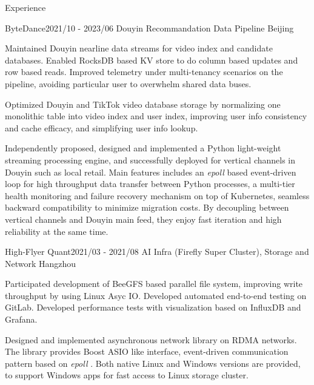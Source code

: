 \documentclass[
	a4paper,  %
	11pt,  %
]{resume}  %
\begin{document}
\begin{rSection}{Experience}

	\begin{rSubsection}{ByteDance}{2021/10 - 2023/06}{ Douyin Recommandation Data Pipeline }{Beijing}
		\item Maintained Douyin nearline data streams for video index and candidate databases.
			  Enabled RocksDB based KV store to do column based updates and row based reads.
			  Improved telemetry under multi-tenancy scenarios on the pipeline,
			  avoiding particular user to overwhelm shared data buses. 
		\item Optimized Douyin and TikTok video database storage by normalizing one monolithic table
			  into video index and user index, improving user info consistency and cache efficacy,
			  and simplifying user info lookup.
		\item Independently proposed, designed and implemented a Python light-weight streaming processing engine,
			  and successfully deployed for vertical channels in Douyin such as local retail.
			  Main features includes an \textit{ epoll } based event-driven loop for high throughput data transfer between Python processes,
			  a multi-tier health monitoring and failure recovery mechanism on top of Kubernetes,
			  seamless backward compatibility to minimize migration costs.
			  By decoupling between vertical channels and Douyin main feed, they enjoy fast iteration and high reliability at the same time.

	\end{rSubsection}


	\begin{rSubsection}{High-Flyer Quant}{2021/03 - 2021/08}{ AI Infra (Firefly Super Cluster), Storage and Network }{Hangzhou}
		\item Participated development of BeeGFS based parallel file system, improving write throughput by using Linux Asyc IO.
			  Developed automated end-to-end testing on GitLab.
			  Developed performance tests with visualization based on InfluxDB and Grafana.
		\item Designed and implemented asynchronous network library on RDMA networks.
			  The library provides Boost ASIO like interface, event-driven communication pattern based on \textit{ epoll }.
			  Both native Linux and Windows versions are provided, to support Windows apps for fast access to Linux storage cluster. 


\end{rSubsection}
\end{rSection}
\end{document}
